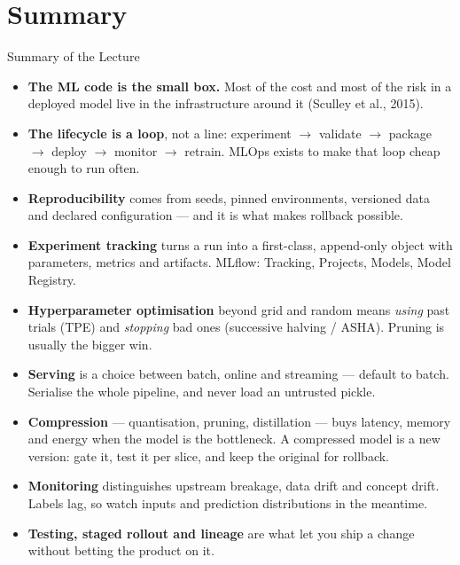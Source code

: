 \section{Summary}

\begin{frame}[allowframebreaks]{Summary of the Lecture}

    \begin{itemize}
        \item \textbf{The ML code is the small box.} Most of the cost and most of the risk in a deployed
              model live in the infrastructure around it (Sculley et al., 2015).

        \item \textbf{The lifecycle is a loop}, not a line: experiment $\rightarrow$ validate $\rightarrow$
              package $\rightarrow$ deploy $\rightarrow$ monitor $\rightarrow$ retrain. MLOps exists to make
              that loop cheap enough to run often.

        \item \textbf{Reproducibility} comes from seeds, pinned environments, versioned data and declared
              configuration --- and it is what makes rollback possible.

        \item \textbf{Experiment tracking} turns a run into a first-class, append-only object with
              parameters, metrics and artifacts. MLflow: Tracking, Projects, Models, Model Registry.

        \item \textbf{Hyperparameter optimisation} beyond grid and random means \emph{using} past trials
              (TPE) and \emph{stopping} bad ones (successive halving / ASHA). Pruning is usually the bigger win.

        \item \textbf{Serving} is a choice between batch, online and streaming --- default to batch.
              Serialise the whole pipeline, and never load an untrusted pickle.

        \item \textbf{Compression} --- quantisation, pruning, distillation --- buys latency, memory and energy
              when the model is the bottleneck. A compressed model is a new version: gate it, test it per
              slice, and keep the original for rollback.

        \item \textbf{Monitoring} distinguishes upstream breakage, data drift and concept drift. Labels lag,
              so watch inputs and prediction distributions in the meantime.

        \item \textbf{Testing, staged rollout and lineage} are what let you ship a change without betting the
              product on it.
    \end{itemize}

\end{frame}

